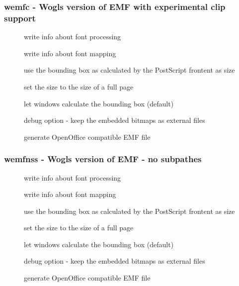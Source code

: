 \documentclass[english,a4paper]{article}
\begin{document}
\subsubsection{wemfc - Wogls version of EMF with experimental clip support}
\begin{description}
\item[] 
write info about font processing


\item[] 
write info about font mapping


\item[] 
use the bounding box as calculated by the PostScript frontent as size


\item[] 
set the size to the size of a full page


\item[] 
let windows calculate the bounding box (default)


\item[] 
debug option - keep the embedded bitmaps as external files 


\item[] 
generate OpenOffice compatible EMF file


\end{description}
\subsubsection{wemfnss - Wogls version of EMF - no subpathes }
\begin{description}
\item[] 
write info about font processing


\item[] 
write info about font mapping


\item[] 
use the bounding box as calculated by the PostScript frontent as size


\item[] 
set the size to the size of a full page


\item[] 
let windows calculate the bounding box (default)


\item[] 
debug option - keep the embedded bitmaps as external files 


\item[] 
generate OpenOffice compatible EMF file


\end{description}
\end{document}
